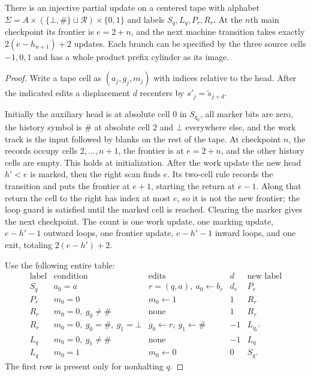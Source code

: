 \begin{lemma}\label{lem:sb-neighbor}
There is an injective partial update on a centered tape with alphabet
$\Sigma=A\times(\{\bot,\#\}\sqcup\mathcal R)\times\{0,1\}$ and labels
$S_q,L_q,P_r,R_r$.  At the $n$th main checkpoint its frontier is $e=2+n$, and the next machine transition takes exactly $2(e-h_{n+1})+2$ updates.  Each branch can be specified by the three source cells $-1,0,1$ and has a whole product prefix cylinder as its image.
\end{lemma}
\begin{proof}
Write a tape cell as $(a_j,g_j,m_j)$ with indices relative to the head.  After the indicated edits a displacement $d$ recenters by $s'_j=\widetilde s_{j+d}$.

Initially the auxiliary head is at absolute cell $0$ in $S_{q_0}$, all marker bits are zero, the history symbol is $\#$ at absolute cell $2$ and $\bot$ everywhere else, and the work track is the input followed by blanks on the rest of the tape.  At checkpoint $n$, the records occupy cells $2,\ldots,n+1$, the frontier is at $e=2+n$, and the other history cells are empty.  This holds at initialization.  After the work update the new head $h'<e$ is marked, then the right scan finds $e$.  Its two-cell rule records the transition and puts the frontier at $e+1$, starting the return at $e-1$.  Along that return the cell to the right has index at most $e$, so it is not the new frontier; the loop guard is satisfied until the marked cell is reached.  Clearing the marker gives the next checkpoint.  The count is one work update, one marking update, $e-h'-1$ outward loops, one frontier update, $e-h'-1$ inward loops, and one exit, totaling $2(e-h')+2$.

Use the following entire table:
\[
\begin{array}{c|l|l|c|c}
\text{label}&\text{condition}&\text{edits}&d&\text{new label}\\\hline
S_q&a_0=a&r=(q,a),\ a_0\gets b_r&d_r&P_r\\
P_r&m_0=0&m_0\gets1&1&R_r\\
R_r&m_0=0,\ g_0\ne\#&\text{none}&1&R_r\\
R_r&m_0=0,\ g_0=\#,\ g_1=\bot&g_0\gets r,\ g_1\gets\#&-1&L_{q_r'}\\
L_q&m_0=0,\ g_1\ne\#&\text{none}&-1&L_q\\
L_q&m_0=1&m_0\gets0&0&S_q.
\end{array}
\]
The first row is present only for nonhalting $q$.


\end{proof}
